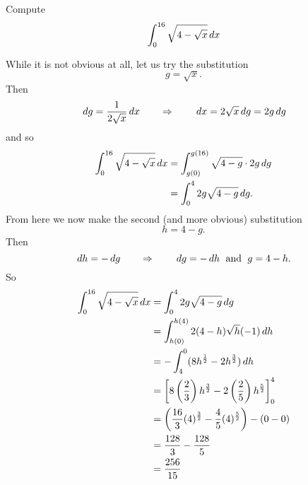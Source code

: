 \documentclass{ximera}
\begin{document}
\begin{example}
Compute
\[
\int_0^{16} \sqrt{4 - \sqrt{x}} \,d x
\]
\begin{explanation}
While it is not obvious at all, let us try the substitution
\[
g = \sqrt{x}.
\]
Then
\[
\,d g = \frac{1}{2 \sqrt{x}} \,d x 	\qquad	\Rightarrow	\qquad	\,d x = 2 \sqrt{x} \,d g = 2g \,d g
\]
and so
\begin{align*}
\int_0^{16} \sqrt{4 - \sqrt{x}} \,d x &= \int_{g(0)}^{g(16)} \sqrt{4-g} \cdot 2g \,d g  \\
&= \int_0^4 2g \sqrt{4-g} \,d g.
\end{align*}
From here we now make the second (and more obvious) substitution
\[
h = 4-g.
\]
Then
\[
\,d h = - \,d g  \qquad	\Rightarrow	\qquad	\,d g = - \,d h \; \text{ and } \; g = 4-h.
\]
So
\begin{align*}
\int_0^{16} \sqrt{4 - \sqrt{x}} \,d x &= \int_0^4 2g \sqrt{4-g} \,d g  \\
&= \int_{h(0)}^{h(4)} 2 (4-h) \sqrt{h} (-1) \,d h  \\
&= - \int_4^0 ( 8h^{\frac{1}{2}} - 2h^{\frac{3}{2}} ) \,d h  \\
&= \bigg[  8 \left( \frac{2}{3} \right) h^{\frac{3}{2}} - 2 \left( \frac{2}{5} \right) h^{\frac{5}{2}}  \bigg]_{0}^{4}  \\
&= \left( \frac{16}{3} (4)^{\frac{3}{2}} - \frac{4}{5} (4)^{\frac{5}{2}} \right) - \left( 0 - 0 \right)  \\
&= \frac{128}{3} - \frac{128}{5}   \\
&= \frac{256}{15}
\end{align*}
\end{explanation}
\end{example}
\end{document}
